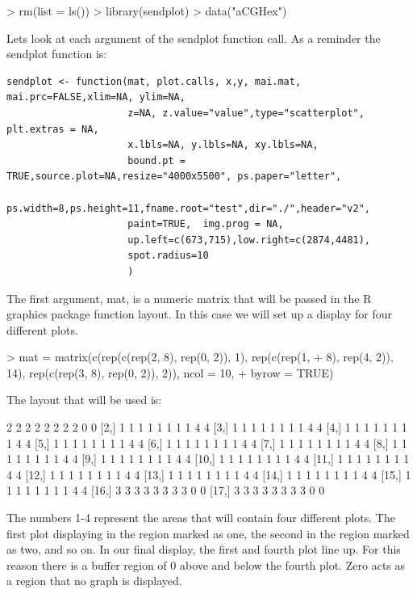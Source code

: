 \documentclass[]{article}
\begin{document}
\begin{Schunk}
\begin{Sinput}
> rm(list = ls())
> library(sendplot)
> data("aCGHex")
\end{Sinput}
\end{Schunk}
Lets look at each argument of the sendplot function call. As a reminder the sendplot function is:
\begin{verbatim}
sendplot <- function(mat, plot.calls, x,y, mai.mat, mai.prc=FALSE,xlim=NA, ylim=NA,
                     z=NA, z.value="value",type="scatterplot", plt.extras = NA,
                     x.lbls=NA, y.lbls=NA, xy.lbls=NA,
                     bound.pt = TRUE,source.plot=NA,resize="4000x5500", ps.paper="letter",
                     ps.width=8,ps.height=11,fname.root="test",dir="./",header="v2",
                     paint=TRUE,  img.prog = NA,
                     up.left=c(673,715),low.right=c(2874,4481),
                     spot.radius=10
                     )
\end{verbatim}
\quad The first argument, mat, is a numeric matrix that will be passed in the R graphics package function layout. In this case we will set up a display for four different plots.

\begin{Schunk}
\begin{Sinput}
> mat = matrix(c(rep(c(rep(2, 8), rep(0, 2)), 1), rep(c(rep(1, 
+     8), rep(4, 2)), 14), rep(c(rep(3, 8), rep(0, 2)), 2)), ncol = 10, 
+     byrow = TRUE)
\end{Sinput}
\end{Schunk}
The layout that will be used is:
\begin{Schunk}
\begin{Soutput}
      [,1] [,2] [,3] [,4] [,5] [,6] [,7] [,8] [,9] [,10]
 [1,]    2    2    2    2    2    2    2    2    0     0
 [2,]    1    1    1    1    1    1    1    1    4     4
 [3,]    1    1    1    1    1    1    1    1    4     4
 [4,]    1    1    1    1    1    1    1    1    4     4
 [5,]    1    1    1    1    1    1    1    1    4     4
 [6,]    1    1    1    1    1    1    1    1    4     4
 [7,]    1    1    1    1    1    1    1    1    4     4
 [8,]    1    1    1    1    1    1    1    1    4     4
 [9,]    1    1    1    1    1    1    1    1    4     4
[10,]    1    1    1    1    1    1    1    1    4     4
[11,]    1    1    1    1    1    1    1    1    4     4
[12,]    1    1    1    1    1    1    1    1    4     4
[13,]    1    1    1    1    1    1    1    1    4     4
[14,]    1    1    1    1    1    1    1    1    4     4
[15,]    1    1    1    1    1    1    1    1    4     4
[16,]    3    3    3    3    3    3    3    3    0     0
[17,]    3    3    3    3    3    3    3    3    0     0
\end{Soutput}
\end{Schunk}
\quad The numbers 1-4 represent the areas that will contain four different plots. The first plot displaying in the region marked as one, the second in the region marked as two, and so on. In our final display, the first and fourth plot line up. For this reason there is a buffer region of 0 above and below the fourth plot. Zero acts as a region that no graph is displayed. \\
\end{document}
